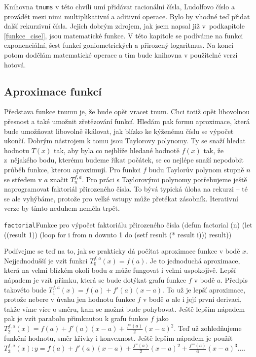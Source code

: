 Knihovna \texttt{tnums} v této chvíli umí přidávat racionální čísla, Ludolfovo číslo a provádět mezi nimi multiplikativní a aditivní operace. Bylo by vhodné teď přidat další rekurzivní čísla. Jejich dobrým zdrojem, jak jsem napsal již v~podkapitole \ref{funkce_cisel}, jsou matematické funkce. V této kapitole se podíváme na funkci exponenciální, šest funkcí goniometrických a přirozený logaritmus. Na konci potom dodělám matematické operace a tím bude knihovna v použitelné verzi hotová.

\subsection{Aproximace funkcí}
Představa funkce tnumu je, že bude opět vracet tnum. Chci totiž opět libovolnou přesnost a také umožnit zřetězování funkcí. Hledám pak formu aproximace, která bude umožňovat libovolně škálovat, jak blízko ke kýženému číslu se výpočet ukončí. Dobrým nástrojem k tomu jsou Taylorovy polynomy. Ty se snaží hledat hodnotu $T(x)$ tak, aby byla co nejblíže hledané hodnotě $f(x)$ tak, že z~nějakého bodu, kterému budeme říkat počátek, se co nejlépe snaží nepodobit průběh funkce, kterou aproximují. Pro funkci $f$ budu Taylorův polynom stupně $n$ se středem v $a$ značit $T^{f,a}_n$. Pro práci s Taylorovými polynomy potřebujeme ještě naprogramovat faktoriál přirozeného čísla. To bývá typická úloha na rekurzi -- té se ale vyhýbáme, protože pro velké vstupy může přetékat zásobník. Iterativní verze by tímto neduhem neměla trpět.

\begin{lispcode}{\texttt{factorial}}{Funkce pro výpočet faktoriálu přirozeného čísla}
(\textcolor{funkcionalni}{defun} \textcolor{pojmenovan}{factorial} (n)
  (\textcolor{vedlejsi}{let} ((result 1))
    (\textcolor{funkcionalni}{loop} \textcolor{obarvi}{for} i \textcolor{obarvi}{from} n \textcolor{obarvi}{downto} 1
          \textcolor{obarvi}{do} (\textcolor{vedlejsi}{setf} result (\textcolor{matematicke}{*} result i)))
    result))
\end{lispcode}

Podívejme se teď na to, jak se prakticky dá počítat aproximace funkce v bodě $x$. Nejjednodušší je vzít funkci $T^{f,a}_0(x) = f(a)$. Je to jednoduchá aproximace, která na velmi blízkém okolí bodu $a$ může fungovat i velmi uspokojivě. Lepší nápadem je vzít přímku, která se bude dotýkat grafu funkce $f$ v bodě $a$. Předpis takovéto bude $T^{f,a}_1(x) = f(a)+f'(a)(x-a)$. To už je lepší aproximace, protože nebere v úvahu jen hodnotu funkce $f$ v bodě $a$ ale i její první derivaci, takže víme více o směru, kam se možná bude pohybovat. Ještě lepším nápadem pak je vzít parabolu přimknutou k grafu funkce $f$ jako $T^{f,a}_2(x) = f(a)+f'(a)(x-a)+\frac{f''(a)}{2}(x-a)^2$. Teď už zohledňujeme funkční hodnotu, směr křivky i konvexnost. Ještě lepším nápadem je použít $T^{f,a}_3(x):y=f(a)+f'(a)(x-a)+\frac{f''(a)}{2}(x-a)^2+\frac{f'''(a)}{6}(x-a)^3\ldots$\cite{MTTP}.


